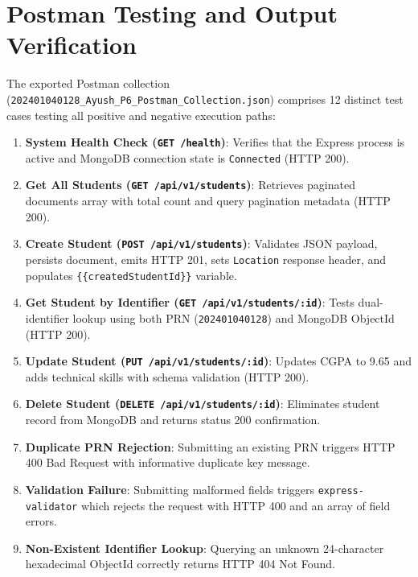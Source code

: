 \documentclass[11pt,a4paper]{article}
\begin{document}
\section{Postman Testing and Output Verification}

The exported Postman collection (\texttt{202401040128\_Ayush\_P6\_Postman\_Collection.json}) comprises 12 distinct test cases testing all positive and negative execution paths:

\begin{enumerate}
    \item \textbf{System Health Check (\texttt{GET /health})}: Verifies that the Express process is active and MongoDB connection state is \texttt{Connected} (HTTP 200).
    \item \textbf{Get All Students (\texttt{GET /api/v1/students})}: Retrieves paginated documents array with total count and query pagination metadata (HTTP 200).
    \item \textbf{Create Student (\texttt{POST /api/v1/students})}: Validates JSON payload, persists document, emits HTTP 201, sets \texttt{Location} response header, and populates \texttt{\{\{createdStudentId\}\}} variable.
    \item \textbf{Get Student by Identifier (\texttt{GET /api/v1/students/:id})}: Tests dual-identifier lookup using both PRN (\texttt{202401040128}) and MongoDB ObjectId (HTTP 200).
    \item \textbf{Update Student (\texttt{PUT /api/v1/students/:id})}: Updates CGPA to 9.65 and adds technical skills with schema validation (HTTP 200).
    \item \textbf{Delete Student (\texttt{DELETE /api/v1/students/:id})}: Eliminates student record from MongoDB and returns status 200 confirmation.
    \item \textbf{Duplicate PRN Rejection}: Submitting an existing PRN triggers HTTP 400 Bad Request with informative duplicate key message.
    \item \textbf{Validation Failure}: Submitting malformed fields triggers \texttt{express-validator} which rejects the request with HTTP 400 and an array of field errors.
    \item \textbf{Non-Existent Identifier Lookup}: Querying an unknown 24-character hexadecimal ObjectId correctly returns HTTP 404 Not Found.
\end{enumerate}
\end{document}
